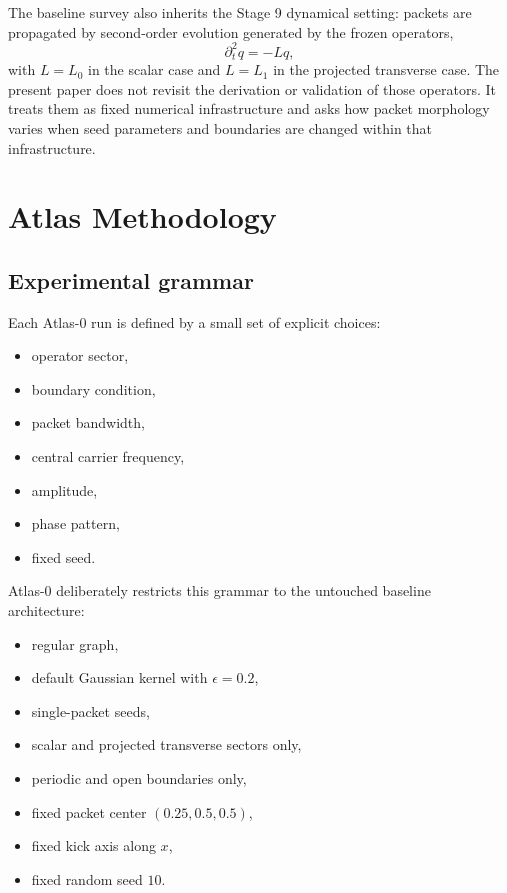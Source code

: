 \documentclass[11pt]{article}
\begin{document}
The baseline survey also inherits the Stage 9 dynamical setting: packets are propagated by second-order evolution generated by the frozen operators,
\begin{equation}
\partial_t^2 q = -L q,
\end{equation}
with $L=L_0$ in the scalar case and $L=L_1$ in the projected transverse case. The present paper does not revisit the derivation or validation of those operators. It treats them as fixed numerical infrastructure and asks how packet morphology varies when seed parameters and boundaries are changed within that infrastructure.

\section{Atlas Methodology}
\subsection{Experimental grammar}
Each Atlas-0 run is defined by a small set of explicit choices:
\begin{itemize}
\item operator sector,
\item boundary condition,
\item packet bandwidth,
\item central carrier frequency,
\item amplitude,
\item phase pattern,
\item fixed seed.
\end{itemize}

Atlas-0 deliberately restricts this grammar to the untouched baseline architecture:
\begin{itemize}
\item regular graph,
\item default Gaussian kernel with $\epsilon = 0.2$,
\item single-packet seeds,
\item scalar and projected transverse sectors only,
\item periodic and open boundaries only,
\item fixed packet center $(0.25,0.5,0.5)$,
\item fixed kick axis along $x$,
\item fixed random seed $10$.
\end{itemize}
\end{document}
